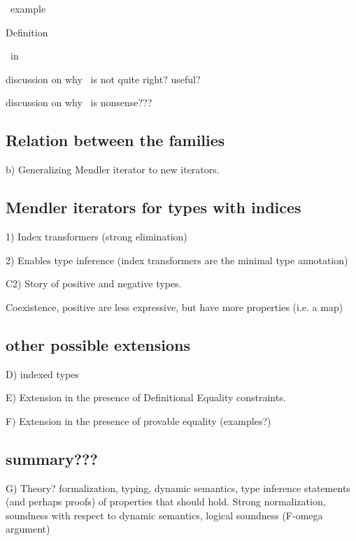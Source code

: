 \MsfIt\ example

Definition

\MsfIt\ in \Fw

discussion on why \MsfPr\ is not quite right? useful?

discussion on why \McvIt\ is nonsense???

\subsection{Relation between the families}
b) Generalizing Mendler iterator to new iterators.

\subsection{Mendler iterators for types with indices}

    1) Index transformers (strong elimination)

    2) Enables type inference (index transformers are the minimal type annotation)


C2) Story of positive and negative types.

    Coexistence, positive are less expressive, but have more properties (i.e. a map)

\subsection{other possible extensions}\label{sec:mendler:etc}
D) indexed types

E) Extension in the presence of Definitional Equality constraints.

F) Extension in the presence of provable equality (examples?)

\subsection{summary???}
G) Theory?
   formalization, typing, dynamic semantics, type inference
   statements (and perhaps proofs) of properties that should hold.
   Strong normalization, soundness with respect to dynamic semantics,
   logical soundness (F-omega argument)

